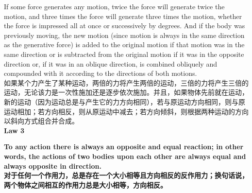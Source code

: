 \documentclass{article}
\begin{document}
\noindent If some force generates any motion, twice the force will generate twice the motion, and three times the force will generate three times the motion, whether the force is impressed all at once or successively by degrees. And if the body was previously moving, the new motion (since motion is always in the same direction as the generative force) is added to the original motion if that motion was in the same direction or is subtracted from the original motion if it was in the opposite direction or, if it was in an oblique direction, is combined obliquely and compounded with it according to the directions of both motions.\\
如果某个力产生了某种运动，两倍的力将产生两倍的运动，三倍的力将产生三倍的运动，无论该力是一次性施加还是逐步依次施加。并且，如果物体先前就在运动，新的运动（因为运动总是与产生它的力方向相同），若与原运动方向相同，则与原运动相加；若方向相反，则从原运动中减去；若方向倾斜，则根据两种运动的方向以斜向方式组合并合成。\\

\noindent\textbf{Law 3}

\addtolength{\leftskip}{1cm}
\addtolength{\rightskip}{1cm}

\noindent \textbf{To any action there is always an opposite and equal reaction; in other words, the actions of two bodies upon each other are always equal and always opposite in direction.}\\
\noindent \textbf{对于任何一个作用力，总是存在一个大小相等且方向相反的反作用力；换句话说，两个物体之间相互的作用力总是大小相等，方向相反。}\\

\addtolength{\leftskip}{-1cm}
\addtolength{\rightskip}{-1cm}
\end{document}
